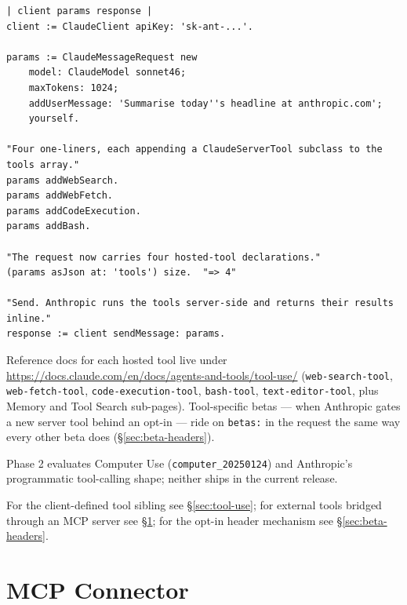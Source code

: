 \documentclass[a4paper,10pt,fleqn]{article}
\begin{document}
\begin{lstlisting}[language={}]
| client params response |
client := ClaudeClient apiKey: 'sk-ant-...'.

params := ClaudeMessageRequest new
    model: ClaudeModel sonnet46;
    maxTokens: 1024;
    addUserMessage: 'Summarise today''s headline at anthropic.com';
    yourself.

"Four one-liners, each appending a ClaudeServerTool subclass to the tools array."
params addWebSearch.
params addWebFetch.
params addCodeExecution.
params addBash.

"The request now carries four hosted-tool declarations."
(params asJson at: 'tools') size.  "=> 4"

"Send. Anthropic runs the tools server-side and returns their results inline."
response := client sendMessage: params.
\end{lstlisting}

\begin{sloppypar}
Reference docs for each hosted tool live under
\url{https://docs.claude.com/en/docs/agents-and-tools/tool-use/}
(\texttt{web-search-tool}, \texttt{web-fetch-tool},
\texttt{code-execution-tool}, \texttt{bash-tool},
\texttt{text-editor-tool}, plus Memory and Tool Search
sub-pages).  Tool-specific betas --- when Anthropic gates a new
server tool behind an opt-in --- ride on \texttt{betas:} in the
request the same way every other beta does
(\S\ref{sec:beta-headers}).
\end{sloppypar}

Phase 2 evaluates Computer Use
(\texttt{computer\_20250124}) and Anthropic's programmatic
tool-calling shape; neither ships in the current release.

For the client-defined tool sibling see \S\ref{sec:tool-use}; for
external tools bridged through an MCP server see
\S\ref{sec:mcp-connector}; for the opt-in header mechanism see
\S\ref{sec:beta-headers}.

\medskip
\begin{sloppypar}
\end{sloppypar}

\section{MCP Connector}
\label{sec:mcp-connector}
\end{document}
